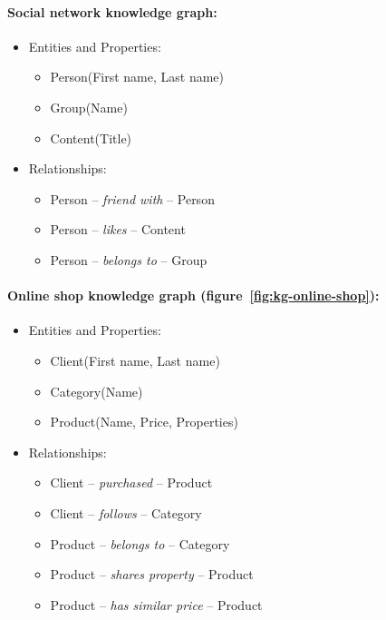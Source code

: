 \paragraph{Social network knowledge graph: }
\begin{itemize}
 \item[] Entities and Properties:
 \begin{itemize}
  \item Person(First name, Last name)
  \item Group(Name)
  \item Content(Title)
 \end{itemize}
 \item[] Relationships:
 \begin{itemize}
  \item Person -- \textit{friend with} -- Person
  \item Person -- \textit{likes} -- Content
  \item Person -- \textit{belongs to} -- Group
 \end{itemize}
\end{itemize}
\paragraph{Online shop knowledge graph (figure~\ref{fig:kg-online-shop}): }
\begin{itemize}
 \item[] Entities and Properties:
 \begin{itemize}
  \item Client(First name, Last name)
  \item Category(Name)
  \item Product(Name, Price, Properties)
 \end{itemize}
 \item[] Relationships:
 \begin{itemize}
  \item Client -- \textit{purchased} -- Product
  \item Client -- \textit{follows} -- Category
  \item Product -- \textit{belongs to} -- Category
  \item Product -- \textit{shares property} -- Product
  \item Product -- \textit{has similar price} -- Product
 \end{itemize}
\end{itemize}

